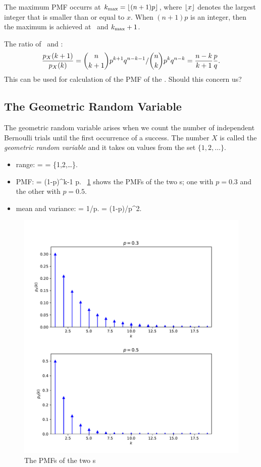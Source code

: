 	\item The maximum PMF occurrs at
	$k_\mathrm{max}= \lfloor (n + 1)p \rfloor$, where $\lfloor x \rfloor$
	denotes the largest integer
	that is smaller than or equal to $x$.
	When $(n + 1)p$ is an integer,
	then the maximum is achieved at \kmax\
	and $k_\mathrm{max} + 1$.

	\item The ratio of \ and : 
	\[
		\frac{p_{X}(k+1) }{p_{X}(k)}
		= {{{n} \choose {k+1}} p^{k+1} q^{n-k-1} }/ {{{n} \choose {k}} p^{k} q^{n-k} }
		= \frac{n-k}{k+1} \frac{p}{q}.
	\]
	This can be used for calculation of the PMF of the \binomrv.
	Should this concern us?
\eit

\subsection{The Geometric Random Variable}
\bit
	\item The geometric random variable arises
	when we count the number of independent Bernoulli trials
	until the first occurrence of a success.
	The number $X$ is called the \emph{geometric random variable}
	and it takes on values from the set $\{1, 2, \ldots\}$.

	\begin{itemize}
		\item range:
			\ssx = \naturals = \{1,2,\ldots \}.
		\eeql
		\item PMF:
			 = (1-p)^{k-1} p.
		\eeql
		\figurename~\ref{fig-geom-pmf} shows the PMFs of the two \geomrv s;
		one with $p=0.3$
		and the other with $p=0.5$.

		\item mean and variance:
			 = 1/p.
		\eeql
			 = (1-p)/p^2.
		\eeql
	\end{itemize}

	\begin{figure}\begin{center}
	\includegraphics[width=.7\linewidth]{figures/geom_pmf}
	\caption{The PMFs of the two \geomrv s}
	\label{fig-geom-pmf}
	\end{center}\end{figure}


